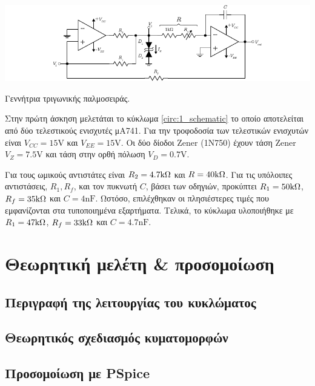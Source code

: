\begin{center}
	\begin{circuitfig}[H]
		\includegraphics[width=14cm]{circuits/micro3_lab1.pdf}
		\caption{Γεννήτρια τριγωνικής παλμοσειράς.}
		\label{circ:1_schematic}
	\end{circuitfig}
\end{center}
\vspace*{-1cm}

Στην πρώτη άσκηση μελετάται το κύκλωμα \ref{circ:1_schematic} το οποίο αποτελείται από δύο τελεστικούς ενισχυτές μΑ741. Για την τροφοδοσία των τελεστικών ενισχυτών είναι $V_{CC}=15\unit{\volt}$ και $V_{EE}=15\unit{\volt}$. Οι δύο δίοδοι Zener (1N750) έχουν τάση Zener $V_Z=7.5\unit{\volt}$ και τάση στην ορθή πόλωση $V_D=0.7\unit{\volt}$.\par
Για τους ωμικούς αντιστάτες είναι $R_2=4.7\kohm$ και $R=40\kohm$. Για τις υπόλοιπες αντιστάσεις, $R_1,R_f$, και τον πυκνωτή $C$, βάσει των οδηγιών, προκύπτει $R_1=50\kohm$, $R_f=35\kohm$ και $C=4\unit{\nano\farad}$. Ωστόσο, επιλέχθηκαν οι πλησιέστερες τιμές που εμφανίζονται στα τυποποιημένα εξαρτήματα. Τελικά, το κύκλωμα υλοποιήθηκε με $R_1=47\kohm$, $R_f=33\kohm$ και $C=4.7\unit{\nano\farad}$.\par

\section{Θεωρητική μελέτη \& προσομοίωση}

	\subsection{Περιγραφή της λειτουργίας του κυκλώματος}
		

	\subsection{Θεωρητικός σχεδιασμός κυματομορφών}
		

	\subsection{Προσομοίωση με PSpice}
		

